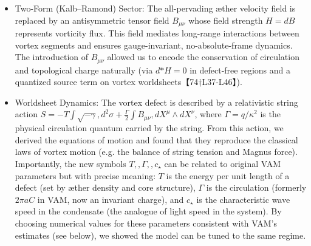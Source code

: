 \documentclass[12pt]{article}
\begin{document}
{{\begin{itemize}

\item 
Two-Form (Kalb–Ramond) Sector: The all-pervading æther velocity field is replaced by an antisymmetric tensor field $B_{\mu\nu}$ whose field strength $H=dB$ represents vorticity flux. This field mediates long-range interactions between vortex segments and ensures gauge-invariant, no-absolute-frame dynamics. The introduction of $B_{\mu\nu}$ allowed us to encode the conservation of circulation and topological charge naturally (via $d{*H}=0$ in defect-free regions and a quantized source term on vortex worldsheets【74†L37-L46】).




\item 
Worldsheet Dynamics: The vortex defect is described by a relativistic string action $S = -T\int \sqrt{-\gamma},d^2\sigma + \frac{\Gamma}{2}\int B_{\mu\nu},dX^\mu\wedge dX^\nu$, where $\Gamma=q/\kappa^2$ is the physical circulation quantum carried by the string. From this action, we derived the equations of motion and found that they reproduce the classical laws of vortex motion (e.g. the balance of string tension and Magnus force). Importantly, the new symbols $T,,\Gamma,,c_\star$ can be related to original VAM parameters but with precise meaning: $T$ is the energy per unit length of a defect (set by æther density and core structure), $\Gamma$ is the circulation (formerly $2\pi a C$ in VAM, now an invariant charge), and $c_\star$ is the characteristic wave speed in the condensate (the analogue of light speed in the system). By choosing numerical values for these parameters consistent with VAM’s estimates (see below), we showed the model can be tuned to the same regime.





\end{itemize}}}
\end{document}
